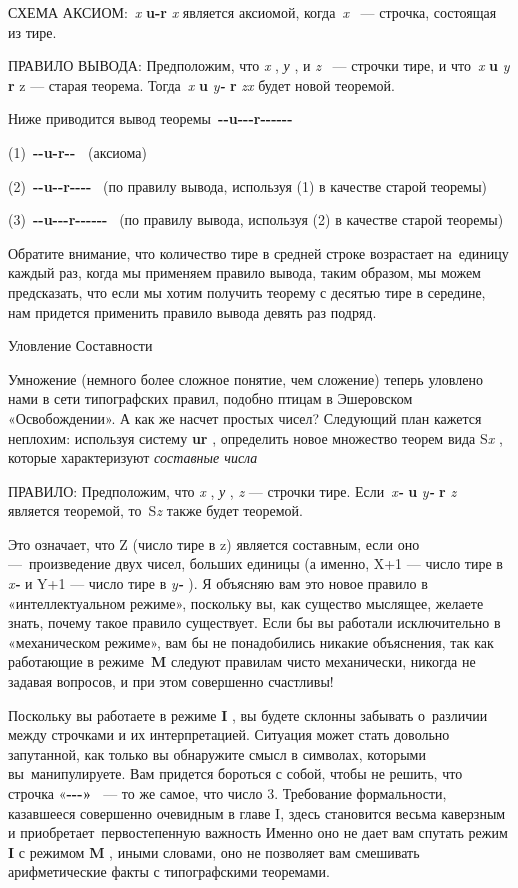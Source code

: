 СХЕМА АКСИОМ:~\emph{x} \textbf{u-r} \emph{x} является аксиомой, когда~\emph{x} ~--- строчка, состоящая из тире.

ПРАВИЛО ВЫВОДА: Предположим, что \emph{x} , \emph{у} , и \emph{z} ~--- строчки тире, и что~\emph{x} \textbf{u} \emph{y} \textbf{r} z --- старая теорема. Тогда~\emph{x} \textbf{u} \emph{y\textbf{-}} \textbf{r} \emph{zx} будет новой теоремой.

Ниже приводится вывод теоремы~\textbf{-\/-u-\/-\/-r-\/-\/-\/-\/-\/-}

(1)~\textbf{-\/-u-r-\/-~} (аксиома)

(2)~\textbf{-\/-u-\/-r-\/-\/-\/-} ~(по правилу вывода, используя (1) в качестве старой теоремы)

(3)~\textbf{-\/-u-\/-\/-r-\/-\/-\/-\/-\/-} ~(по правилу вывода, используя (2) в качестве старой теоремы)

Обратите внимание, что количество тире в средней строке возрастает на~единицу каждый раз, когда мы применяем правило вывода, таким образом, мы можем предсказать, что если мы хотим получить теорему с десятью тире в середине, нам придется применить правило вывода девять раз подряд.

Уловление Составности

Умножение (немного более сложное понятие, чем сложение) теперь уловлено нами в сети типографских правил, подобно птицам в Эшеровском «Освобождении». А как же насчет простых чисел? Следующий план кажется неплохим: используя систему \textbf{ur} , определить новое множество теорем вида S\emph{x} , которые характеризуют \emph{составные числа}

ПРАВИЛО: Предположим, что \emph{x} , \emph{у} , \emph{z} --- строчки тире. Если~\emph{x\textbf{-}} \textbf{u} \emph{y\textbf{-}} \textbf{r} \emph{z} является теоремой, то~S\emph{z} также будет теоремой.

Это означает, что Z (число тире в z) является составным, если оно ---~произведение двух чисел, больших единицы (а именно, X+1 --- число тире в \emph{x\textbf{-}} и Y+1 --- число тире в \emph{y\textbf{-}} ). Я объясняю вам это новое правило в «интеллектуальном режиме», поскольку вы, как существо мыслящее, желаете знать, почему такое правило существует. Если бы вы работали исключительно в «механическом режиме», вам бы не понадобились никакие объяснения, так как работающие в режиме~\textbf{M} следуют правилам чисто механически, никогда не задавая вопросов, и при этом совершенно счастливы!

Поскольку вы работаете в режиме \textbf{I} , вы будете склонны забывать о~различии между строчками и их интерпретацией. Ситуация может стать довольно запутанной, как только вы обнаружите смысл в символах, которыми вы~манипулируете. Вам придется бороться с собой, чтобы не решить, что строчка «\textbf{-\/-\/-»} ~--- то же самое, что число 3. Требование формальности, казавшееся совершенно очевидным в главе I, здесь становится весьма каверзным и приобретает~первостепенную важность Именно оно не дает вам спутать режим \textbf{I} с режимом \textbf{M} , иными словами, оно не позволяет вам смешивать арифметические факты с типографскими теоремами.

